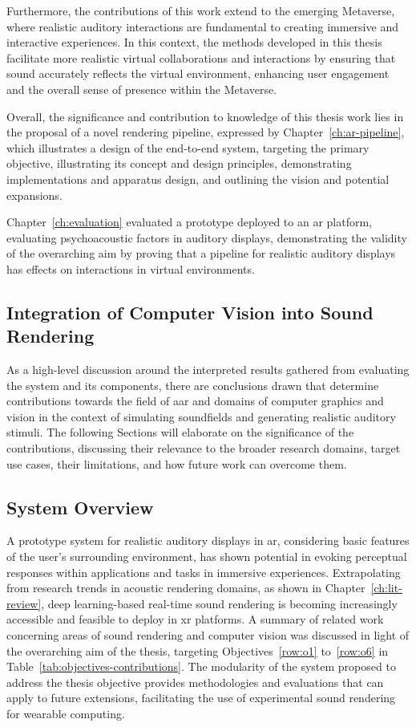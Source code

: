 Furthermore, the contributions of this work extend to the emerging Metaverse, where realistic auditory interactions are fundamental to creating immersive and interactive experiences. In this context, the methods developed in this thesis facilitate more realistic virtual collaborations and interactions by ensuring that sound accurately reflects the virtual environment, enhancing user engagement and the overall sense of presence within the Metaverse.\par
Overall, the significance and contribution to knowledge of this thesis work lies in the proposal of a novel rendering pipeline, expressed by Chapter~\ref{ch:ar-pipeline}, which illustrates a design of the end-to-end system, targeting the primary objective, illustrating its concept and design principles, demonstrating implementations and apparatus design, and outlining the vision and potential expansions.\par
Chapter~\ref{ch:evaluation} evaluated a prototype deployed to an \acrshort{ar} platform, evaluating psychoacoustic factors in auditory displays, demonstrating the validity of the overarching aim by proving that a pipeline for realistic auditory displays has effects on interactions in virtual environments.\par

\subsection{Integration of Computer Vision into Sound Rendering}
As a high-level discussion around the interpreted results gathered from evaluating the system and its components, there are conclusions drawn that determine contributions towards the field of \acrfull{aar} and domains of computer graphics and vision in the context of simulating soundfields and generating realistic auditory stimuli. The following Sections will elaborate on the significance of the contributions, discussing their relevance to the broader research domains, target use cases, their limitations, and how future work can overcome them.

\subsection{System Overview}
A prototype system for realistic auditory displays in \acrshort{ar}, considering basic features of the user's surrounding environment, has shown potential in evoking perceptual responses within applications and tasks in immersive experiences. Extrapolating from research trends in acoustic rendering domains, as shown in Chapter~\ref{ch:lit-review}, deep learning-based real-time sound rendering is becoming increasingly accessible and feasible to deploy in \acrshort{xr} platforms. A summary of related work concerning areas of sound rendering and computer vision was discussed in light of the overarching aim of the thesis, targeting Objectives~\ref{row:o1} to~\ref{row:o6} in Table~\ref{tab:objectives-contributions}.
The modularity of the system proposed to address the thesis objective provides methodologies and evaluations that can apply to future extensions, facilitating the use of experimental sound rendering for wearable computing.

